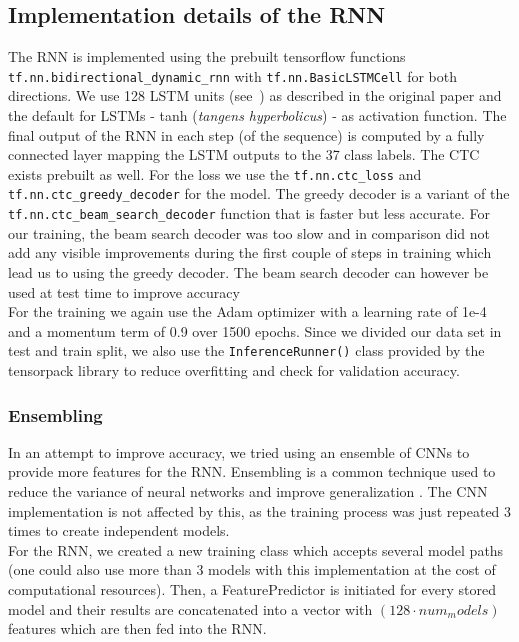 \documentclass{utue} %
\begin{document}
\subsection{Implementation details of the RNN}
The RNN is implemented using the prebuilt tensorflow functions \texttt{tf.nn.bidirectional\_dynamic\_rnn} with \texttt{tf.nn.BasicLSTMCell} for both directions. We use 128 LSTM units (see~\cite{lstmpaper}) as described in the original paper and the default for LSTMs - tanh (\textit{tangens hyperbolicus}) - as activation function. The final output of the RNN in each step (of the sequence) is computed by a fully connected layer mapping the LSTM outputs to the 37 class labels.
The CTC exists prebuilt as well. For the loss we use the \texttt{tf.nn.ctc\_loss} and \texttt{tf.nn.ctc\_greedy\_decoder} for the model. The greedy decoder is a variant of the \texttt{tf.nn.ctc\_beam\_search\_decoder} function that is faster but less accurate. For our training, the beam search decoder was too slow and in comparison did not add any visible improvements during the first couple of steps in training which lead us to using the greedy decoder. The beam search decoder can however be used at test time to improve accuracy\\
For the training we again use the Adam optimizer with a learning rate of 1e-4 and a momentum term of 0.9 over 1500 epochs. Since we divided our data set in test and train split, we also use the \texttt{InferenceRunner()} class provided by the tensorpack library to reduce overfitting and check for validation accuracy. 

\subsubsection{Ensembling}
In an attempt to improve accuracy, we tried using an ensemble of CNNs to provide more features for the RNN. Ensembling is a common technique used to reduce the variance of neural networks and improve generalization \cite{ensembles}. The CNN implementation is not affected by this, as the training process was just repeated 3 times to create independent models.\\
For the RNN, we created a new training class which accepts several model paths (one could also use more than 3 models with this implementation at the cost of computational resources). Then, a FeaturePredictor is initiated for every stored model and their results are concatenated into a vector with $(128\cdot num_models)$ features which are then fed into the RNN.
\end{document}
